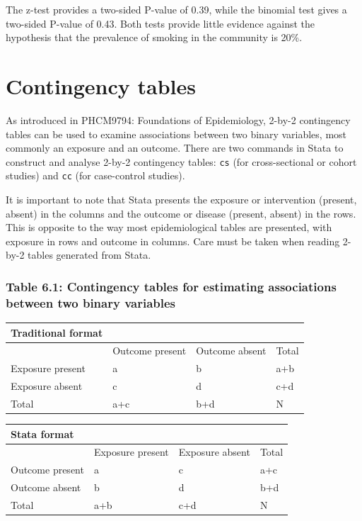 \documentclass[
]{memoir}
\begin{document}
The z-test provides a two-sided P-value of 0.39, while the binomial test gives a two-sided P-value of 0.43. Both tests provide little evidence against the hypothesis that the prevalence of smoking in the community is 20\%.

\hypertarget{contingency-tables}{%
\section{Contingency tables}\label{contingency-tables}}

As introduced in PHCM9794: Foundations of Epidemiology, 2-by-2 contingency tables can be used to examine associations between two binary variables, most commonly an exposure and an outcome. There are two commands in Stata to construct and analyse 2-by-2 contingency tables: \texttt{cs} (for cross-sectional or cohort studies) and \texttt{cc} (for case-control studies).

It is important to note that Stata presents the exposure or intervention (present, absent) in the columns and the outcome or disease (present, absent) in the rows. This is opposite to the way most epidemiological tables are presented, with exposure in rows and outcome in columns. Care must be taken when reading 2-by-2 tables generated from Stata.

\hypertarget{table-6.1-contingency-tables-for-estimating-associations-between-two-binary-variables}{%
\subsubsection{Table 6.1: Contingency tables for estimating associations between two binary variables}\label{table-6.1-contingency-tables-for-estimating-associations-between-two-binary-variables}}

\begin{longtable}[]{@{}llll@{}}
\toprule
\textbf{Traditional format} & & & \\
\midrule
\endhead
& Outcome present & Outcome absent & Total \\
Exposure present & a & b & a+b \\
Exposure absent & c & d & c+d \\
Total & a+c & b+d & N \\
\bottomrule
\end{longtable}

\begin{longtable}[]{@{}llll@{}}
\toprule
\textbf{Stata format} & & & \\
\midrule
\endhead
& Exposure present & Exposure absent & Total \\
Outcome present & a & c & a+c \\
Outcome absent & b & d & b+d \\
Total & a+b & c+d & N \\
\bottomrule
\end{longtable}
\end{document}
